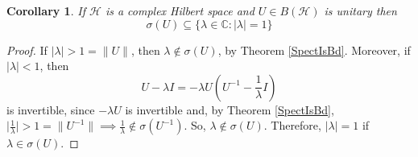 \documentclass{report}
\newtheorem{cor}{Corollary}
\begin{document}
\begin{cor}
If $\mathcal{H}$ is a complex Hilbert space and $U \in B(\mathcal{H})$ is unitary then
$$
\sigma(U) \subseteq\{\lambda \in \mathbb{C}:|\lambda|=1\}
$$
\end{cor}
\begin{proof}
  If $|\lambda|>1=\lVert U\rVert$, then $\lambda\notin\sigma(U)$, by Theorem \ref{SpectIsBd}. Moreover, if $|\lambda|<1$, then
$$
U-\lambda I = -\lambda U(U^{-1}-\frac{1}{\lambda}I)
$$
is invertible, since $-\lambda U$ is invertible and, by Theorem \ref{SpectIsBd}, $\Big|\frac{1}{\lambda}\Big|>1=\lVert U^{-1}\rVert\implies\frac{1}{\lambda}\notin\sigma(U^{-1})$. So, $\lambda\notin\sigma(U)$. Therefore, $|\lambda|=1$ if $\lambda\in\sigma(U)$.
\end{proof}

%
\end{document}
